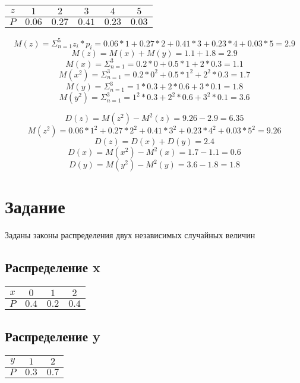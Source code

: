 \documentclass[a4paper]{article}
\begin{document}
\begin{table}[H]
\centering
\begin{tabular}{|c|c|c|c|c|c|}
\hline
$z$ & $1$ & $2$ & $3$ & $4$ & $5$ \\
\hline
$P$ & $0.06$ & $0.27$ & $0.41$ & $0.23$ & $0.03$\\
\hline
\end{tabular}
\end{table}

$$ M(z) = \Sigma_{n=1}^5 z_i*p_i = 0.06 * 1 + 0.27 * 2 + 0.41 * 3 + 0.23 * 4 + 0.03 * 5 = 2.9$$
$$ M(z) = M(x) + M(y) = 1.1 + 1.8 = 2.9 $$
$$ M(x) = \Sigma_{n=1}^3 = 0.2 * 0 + 0.5 * 1 + 2 * 0.3 = 1.1 $$
$$ M(x^2) = \Sigma_{n=1}^3 = 0.2 * 0^2 + 0.5 * 1^2 + 2^2 * 0.3 = 1.7 $$ %
$$ M(y) = \Sigma_{n=1}^3 = 1 * 0.3 + 2 * 0.6 + 3 * 0.1 = 1.8 $$
$$ M(y^2) = \Sigma_{n=1}^3 = 1^2 * 0.3 + 2^2 * 0.6 + 3 ^ 2 * 0.1 = 3.6 $$

$$ D(z) = M(z^2) - M^2(z) =  9.26 - 2.9 = 6.35 $$
$$ M(z^2) = 0.06 * 1^2 + 0.27 * 2^2 + 0.41 * 3^2 + 0.23 * 4^2 + 0.03 * 5^2 = 9.26 $$
$$ D(z) = D(x) + D(y) = 2.4 $$
$$ D(x) = M(x^2) - M^2(x) = 1.7 - 1.1 = 0.6$$
$$ D(y) = M(y^2) - M^2(y) = 3.6- 1.8 = 1.8$$


\section{Задание}
Заданы законы распределения двух независимых случайных величин

\subsection{Распределение x}
\begin{table}[H]
\centering
\begin{tabular}{|c|c|c|c|}
\hline
$x$ & $0$ & $1$ & $2$\\
\hline
$P$ & $0.4$ & $0.2$ & $0.4$ \\
\hline
\end{tabular}
\end{table}

\subsection{Распределение y}
\begin{table}[H]
\centering
\begin{tabular}{|c|c|c|}
\hline
$y$ & $1$ & $2$\\
\hline
$P$ & $0.3$ & $0.7$ \\
\hline
\end{tabular}
\end{table}
  
\end{document}
